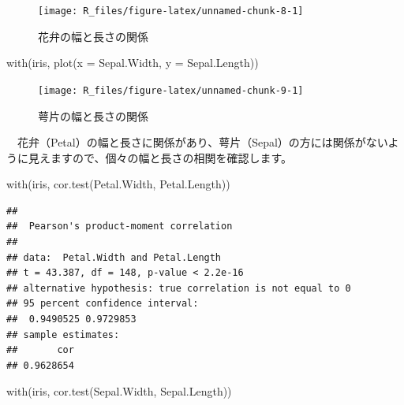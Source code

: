 \documentclass[
  12pt,
]{book}
\newenvironment{Shaded}{\begin{snugshade}}{\end{snugshade}}
\newcommand{\AttributeTok}[1]{\textcolor[rgb]{0.77,0.63,0.00}{#1}}
\newcommand{\FunctionTok}[1]{\textcolor[rgb]{0.00,0.00,0.00}{#1}}
\newcommand{\NormalTok}[1]{#1}
\begin{document}
\begin{figure}[H]

{\centering \texttt{[image: R\_files/figure-latex/unnamed-chunk-8-1]} 

}

\caption{花弁の幅と長さの関係}\label{fig:unnamed-chunk-8}
\end{figure}

\begin{Shaded}
\begin{Highlighting}[numbers=left,,]
\FunctionTok{with}\NormalTok{(iris, }\FunctionTok{plot}\NormalTok{(}\AttributeTok{x =}\NormalTok{ Sepal.Width, }\AttributeTok{y =}\NormalTok{ Sepal.Length))}
\end{Highlighting}
\end{Shaded}

\begin{figure}[H]

{\centering \texttt{[image: R\_files/figure-latex/unnamed-chunk-9-1]} 

}

\caption{萼片の幅と長さの関係}\label{fig:unnamed-chunk-9}
\end{figure}

　花弁（Petal）の幅と長さに関係があり、萼片（Sepal）の方には関係がないように見えますので、個々の幅と長さの相関を確認します。

\begin{Shaded}
\begin{Highlighting}[numbers=left,,]
\FunctionTok{with}\NormalTok{(iris, }\FunctionTok{cor.test}\NormalTok{(Petal.Width, Petal.Length))}
\end{Highlighting}
\end{Shaded}

\begin{verbatim}
## 
##  Pearson's product-moment correlation
## 
## data:  Petal.Width and Petal.Length
## t = 43.387, df = 148, p-value < 2.2e-16
## alternative hypothesis: true correlation is not equal to 0
## 95 percent confidence interval:
##  0.9490525 0.9729853
## sample estimates:
##       cor 
## 0.9628654
\end{verbatim}

\newpage

\begin{Shaded}
\begin{Highlighting}[numbers=left,,]
\FunctionTok{with}\NormalTok{(iris, }\FunctionTok{cor.test}\NormalTok{(Sepal.Width, Sepal.Length))}
\end{Highlighting}
\end{Shaded}
\end{document}
